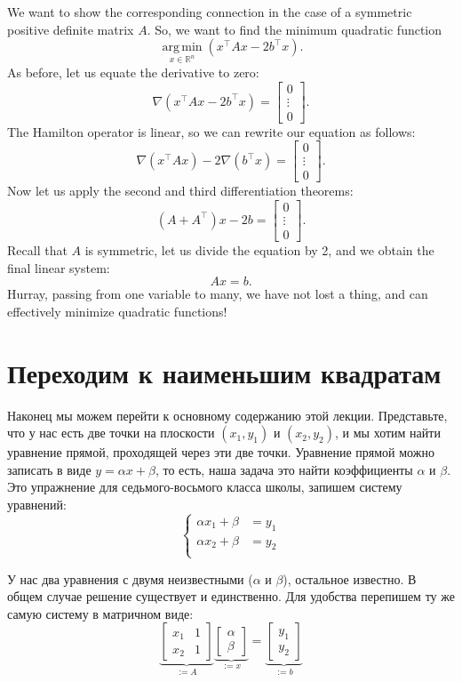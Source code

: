 \documentclass[notitlepage]{report}
\DeclareMathOperator*{\argmin}{arg\,min}
\begin{document}
We want to show the corresponding connection in the case of a symmetric positive definite matrix $A$.
So, we want to find the minimum quadratic function
$$\argmin\limits_{x\in\mathbb R^n} (x^\top A x - 2b^\top x).$$
As before, let us equate the derivative to zero:
$$\nabla (x^\top A x - 2b^\top x) = \begin{bmatrix}0 \\ \vdots \\ 0 \end{bmatrix}.$$
The Hamilton operator is linear, so we can rewrite our equation as follows:
$$\nabla (x^\top A x) - 2\nabla(b^\top x) = \begin{bmatrix}0 \\ \vdots \\ 0 \end{bmatrix}.$$
Now let us apply the second and third differentiation theorems:
$$(A+A^\top)x - 2b = \begin{bmatrix}0 \\ \vdots \\ 0 \end{bmatrix}.$$
Recall that $A$ is symmetric, let us divide the equation by 2, and we obtain the final linear system:
$$Ax = b.$$
Hurray, passing from one variable to many, we have not lost a thing, and can effectively minimize quadratic functions!


\section{Переходим к наименьшим квадратам}
Наконец мы можем перейти к основному содержанию этой лекции. Представьте, что у нас есть две точки на плоскости $(x_1, y_1)$ и $(x_2, y_2)$, и мы хотим найти уравнение прямой, проходящей через эти две точки.
Уравнение прямой можно записать в виде $y = \alpha x + \beta$, то есть, наша задача это найти коэффициенты $\alpha$ и $\beta$. Это упражнение для седьмого-восьмого класса школы, запишем систему уравнений:
$$
\left\{
\begin{split}
\alpha x_1 + \beta &= y_1\\
\alpha x_2 + \beta &= y_2\\
\end{split}
\right.
$$

У нас два уравнения с двумя неизвестными ($\alpha$ и $\beta$), остальное известно.
В общем случае решение существует и единственно. Для удобства перепишем ту же самую систему в матричном виде:
$$
\underbrace{\begin{bmatrix}x_1  & 1 \\ x_2 & 1 \end{bmatrix}}_{:=A} 
\underbrace{\begin{bmatrix} \alpha \\ \beta \end{bmatrix}}_{:=x} = \underbrace{\begin{bmatrix} y_1 \\ y_2 \end{bmatrix}}_{:=b}
$$
\end{document}
